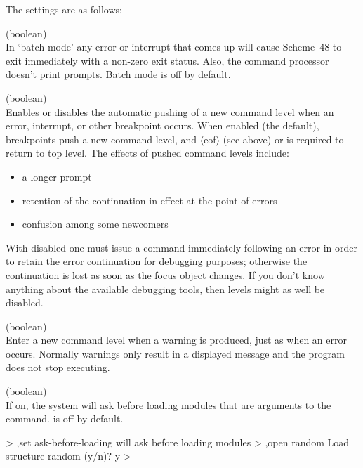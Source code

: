 The settings are as follows:
\begin{description}
\item {} (boolean)\\
    In `batch mode' any error or interrupt that comes up will cause
    Scheme~48 to exit immediately with a non-zero exit status.  Also,
    the command processor doesn't print prompts.  Batch mode is
    off by default.


\item {} (boolean)\\
    Enables or disables the automatic pushing of a new command level when
    an error, interrupt, or other breakpoint occurs.
    When enabled (the default), breakpoints push a new command level,
    and $\langle{}$eof$\rangle{}$ (see above)
    or  is required to return to top level.  The effects of
    pushed command levels include:
\begin{itemize}
\item a longer prompt
\item retention of the continuation in effect at the point of errors
\item confusion among some newcomers
\end{itemize}
    With  disabled one must issue a
     command immediately
    following an error in order to retain the error continuation for
    debugging purposes; otherwise the continuation is lost as soon as
    the focus object changes.  If you don't know anything about the
    available debugging tools, then levels might as well be disabled.

\item {} (boolean)\\
    Enter a new command level when a warning is produced, just as
    when an error occurs.  Normally warnings only result in a displayed
    message and the program does not stop executing.

\item {} (boolean)\\
    If on, the system will ask before loading modules that are arguments
    to the  command.   is off by
    default.
\begin{example}
> ,set ask-before-loading
will ask before loading modules
> ,open random
Load structure random (y/n)? y
>
\end{example}


\end{description}
